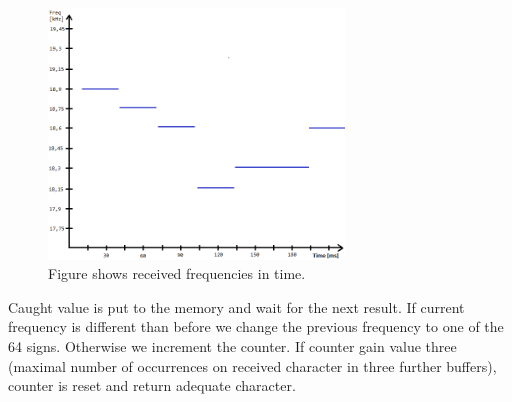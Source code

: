 \documentclass[11pt,titlepage]{article}
\theoremstyle{plain}
\begin{document}
\begin{figure}[H]
	\centering
	\includegraphics[width=0.70\textwidth]{img/receiving}
	\caption{Figure shows received frequencies in time.}
\end{figure}

Caught value is put to the memory and wait for the next result. If current frequency is different than before we change the previous frequency to one of the 64 signs. Otherwise we increment the counter. If counter gain value three (maximal number of occurrences on received character in three further buffers), counter is reset and return adequate character.
\end{document}
